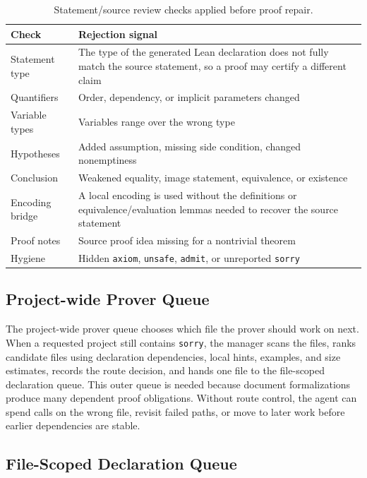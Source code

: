 \documentclass{article}
\newcommand{\lean}{Lean\xspace}
\begin{document}
\begin{table}[t]
\centering
\caption{Statement/source review checks applied before proof repair.}
\label{tab:review-checks}
\footnotesize
\setlength{\tabcolsep}{3pt}
\begin{tabular}{p{}p{}}
\toprule
Check & Rejection signal \\
\midrule
Statement type & The type of the generated \lean declaration does not fully match the source statement, so a proof may certify a different claim \\
Quantifiers & Order, dependency, or implicit parameters changed \\
Variable types & Variables range over the wrong type \\
Hypotheses & Added assumption, missing side condition, changed nonemptiness \\
Conclusion & Weakened equality, image statement, equivalence, or existence \\
Encoding bridge & A local encoding is used without the definitions or equivalence/evaluation lemmas needed to recover the source statement \\
Proof notes & Source proof idea missing for a nontrivial theorem \\
Hygiene & Hidden \texttt{axiom}, \texttt{unsafe}, \texttt{admit}, or unreported \texttt{sorry} \\
\bottomrule
\end{tabular}
\end{table}

\subsection{Project-wide Prover Queue}
The project-wide prover queue chooses which file the prover should work on next.
When a requested project still contains \texttt{sorry}, the manager scans the files, ranks candidate files using declaration dependencies, local hints, examples, and size estimates, records the route decision, and hands one file to the file-scoped declaration queue.
This outer queue is needed because document formalizations produce many dependent proof obligations.
Without route control, the agent can spend calls on the wrong file, revisit failed paths, or move to later work before earlier dependencies are stable.

\subsection{File-Scoped Declaration Queue}
\end{document}
